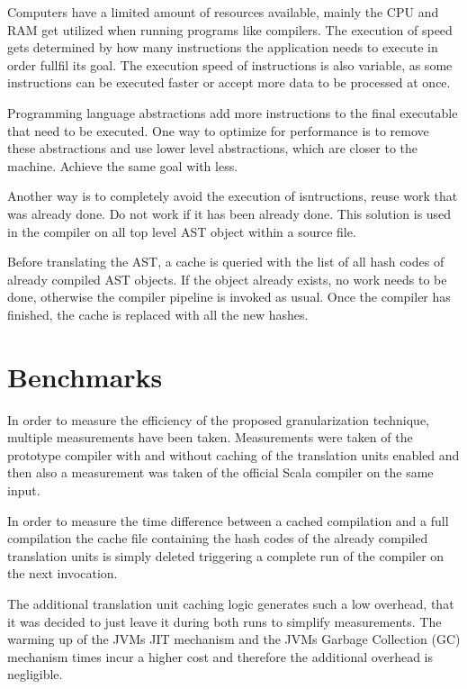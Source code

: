 \documentclass{VUMIFPSbakalaurinis}
\begin{document}
Computers have a limited amount of resources available, mainly the CPU and RAM get utilized when running programs like compilers.
The execution of speed gets determined by how many instructions the application needs to execute in order fullfil its goal.
The execution speed of instructions is also variable, as some instructions can be executed faster or accept more data to be processed at once.

Programming language abstractions add more instructions to the final executable that need to be executed.
One way to optimize for performance is to remove these abstractions and use lower level abstractions, which are closer to the machine.
Achieve the same goal with less.%

Another way is to completely avoid the execution of isntructions, reuse work that was already done.
Do not work if it has been already done.
This solution is used in the compiler on all top level AST object within a source file.

Before translating the AST, a cache is queried with the list of all hash codes of already compiled AST objects.
If the object already exists, no work needs to be done, otherwise the compiler pipeline is invoked as usual.
Once the compiler has finished, the cache is replaced with all the new hashes.

\section{Benchmarks}
In order to measure the efficiency of the proposed granularization technique, multiple measurements have been taken.
Measurements were taken of the prototype compiler with and without caching of the translation units enabled and then also a measurement was taken of the official Scala compiler on the same input.

In order to measure the time difference between a cached compilation and a full compilation the cache file containing the hash codes of the already compiled translation units is simply deleted triggering a complete run of the compiler on the next invocation.

The additional translation unit caching logic generates such a low overhead, that it was decided to just leave it during both runs to simplify measurements.
The warming up of the JVMs JIT mechanism and the JVMs Garbage Collection (GC) mechanism times incur a higher cost and therefore the additional overhead is negligible.
\end{document}
